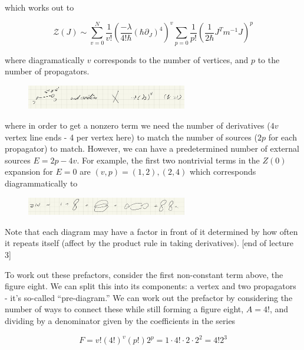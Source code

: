 \documentclass{article}
\theoremstyle{definition}
\begin{document}
which works out to

\begin{equation}
  \mathcal{Z}(J) \sim \sum_{v=0}^N \frac{1}{v!} \left( \frac{-\lambda}{4! \hbar}
    (\hbar \partial_J)^4 \right)^v \sum_{p = 0} \frac{1}{p!} \left( \frac{1}{2\hbar}
    J^T m^{-1} J \right)^p
\end{equation}

where diagramatically $v$ corresponds to the number of vertices, and $p$ to the
number of propagators.

\begin{figure}[H]
  \centering
  \includegraphics[width=7cm]{res/AQFT/diagram_interpretation}
  \label{diagram_interpretation}
\end{figure}
 
where in order to get a nonzero term we need the number of derivatives ($4v$
vertex line ends - 4 per vertex here) to match the number of sources ($2p$ for
each propagator) to match. However, we can have a predetermined number of
external sources $E = 2p - 4v$. For example, the first two nontrivial terms in
the $Z(0)$ expansion for $E = 0$ are $(v, p) = (1, 2), (2, 4)$ which corresponds
diagrammatically to

\begin{figure}[H]
  \centering
  \includegraphics[width=7cm]{res/AQFT/quartic_series_diagram}
  \label{quartic_series_diagram}
\end{figure}

Note that each diagram may have a factor in front of it determined by how often
it repeats itself (affect by the product rule in taking derivatives). [end of
lecture 3]

To work out these prefactors, consider the first non-constant term above, the
figure eight. We can split this into its components: a vertex and two
propagators - it's so-called ``pre-diagram.'' We can work out the prefactor by
considering the number of ways to connect these while still forming a figure
eight, $A = 4!$, and dividing by a denominator given by the coefficients in the
series

\begin{equation}
  F = v! (4!)^v (p!) 2^p = 1 \cdot 4! \cdot 2 \cdot 2^2 = 4! 2^3
\end{equation}
\end{document}
